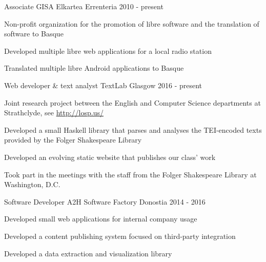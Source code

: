 

\begin{cventries}

  \cventry
    {Associate} %
    {GISA Elkartea} %
    {Errenteria} %
    {2010 - present} %
    {
      \begin{cvitems} %
        \item {Non-profit organization for the promotion of libre software and
            the translation of software to Basque}
        \item {Developed multiple libre web applications for a local radio
            station}
        \item {Translated multiple libre Android applications to Basque}
      \end{cvitems}
    }

  \cventry
    {Web developer \& text analyst} %
    {TextLab} %
    {Glasgow} %
    {2016 - present} %
    {
      \begin{cvitems} %
        \item {Joint research project between the English and Computer Science
            departments at Strathclyde, see \url{http://losp.us/}}
        \item {Developed a small Haskell library that parses and analyses the
            TEI-encoded texts provided by the Folger Shakespeare Library}
        \item {Developed an evolving static website that publishes our class'
            work}
        \item {Took part in the meetings with the staff from the Folger
            Shakespeare Library at Washington, D.C.}
      \end{cvitems}
    }

  \cventry
    {Software Developer} %
    {A2H Software Factory} %
    {Donostia} %
    {2014 - 2016} %
    {
      \begin{cvitems} %
        \item {Developed small web applications for internal company usage}
        \item {Developed a content publishing system focused on third-party
            integration}
        \item {Developed a data extraction and visualization library}
      \end{cvitems}
    }

\end{cventries}
